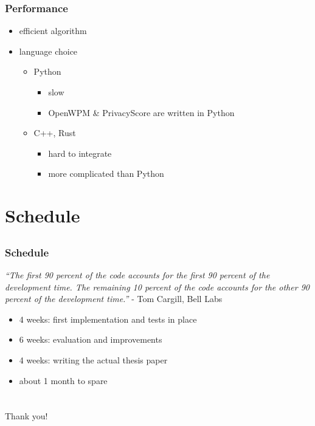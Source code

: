 \documentclass{beamer}
\begin{document}
\begin{frame}
    \frametitle{Performance}
    \begin{itemize}
        \item efficient algorithm
        \item language choice
        \begin{itemize}
            \item Python
            \begin{itemize}
                \item slow
                \item OpenWPM \& PrivacyScore are written in Python
            \end{itemize}
            \item C++, Rust
            \begin{itemize}
                \item hard to integrate
                \item more complicated than Python
            \end{itemize}
        \end{itemize}
    \end{itemize}
\end{frame}


\section{Schedule}
\subsection{}


\begin{frame}
    \frametitle{Schedule}
    \scriptsize
    \textit{``The first 90 percent of the code accounts for the first 90 percent of the development time. The remaining 10 percent of the code accounts for the other 90 percent of the development time.''} - Tom Cargill, Bell Labs
    \\
    \normalsize
    \begin{itemize}
        \item 4 weeks: first implementation and tests in place
        \item 6 weeks: evaluation and improvements
        \item 4 weeks: writing the actual thesis paper
        \item about 1 month to spare
    \end{itemize}
\end{frame}


\section{}
\begin{frame}[c]
    \begin{center}
    \Huge Thank you!
    \end{center}
\end{frame}


\end{document}
